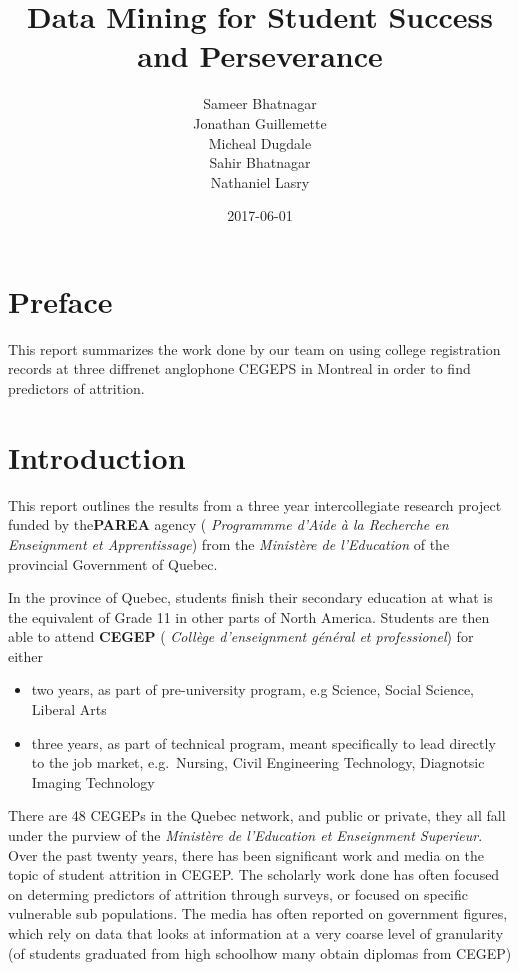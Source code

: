 \documentclass[]{book}
\title{Data Mining for Student Success and Perseverance}
\author{Sameer Bhatnagar \\ Jonathan Guillemette \\ Micheal Dugdale \\ Sahir Bhatnagar \\ Nathaniel Lasry}
\date{2017-06-01}
\providecommand{\tightlist}{%
  \setlength{\itemsep}{0pt}\setlength{\parskip}{0pt}}
\theoremstyle{definition}
\theoremstyle{definition}
\theoremstyle{remark}
\begin{document}
\maketitle

{
\setcounter{tocdepth}{1}
\tableofcontents
}
\chapter{Preface}\label{preface}

This report summarizes the work done by our team on using college
registration records at three diffrenet anglophone CEGEPS in Montreal in
order to find predictors of attrition.

\chapter{Introduction}\label{intro}

This report outlines the results from a three year intercollegiate
research project funded by the\textbf{PAREA} agency ( \emph{Programmme
d'Aide à la Recherche en Enseignment et Apprentissage}) from the
\emph{Ministère de l'Education} of the provincial Government of Quebec.

In the province of Quebec, students finish their secondary education at
what is the equivalent of Grade 11 in other parts of North America.
Students are then able to attend \textbf{CEGEP} ( \emph{Collège
d'enseignment général et professionel}) for either

\begin{itemize}
\tightlist
\item
  two years, as part of pre-university program, e.g Science, Social
  Science, Liberal Arts
\item
  three years, as part of technical program, meant specifically to lead
  directly to the job market, e.g.~Nursing, Civil Engineering
  Technology, Diagnotsic Imaging Technology
\end{itemize}

There are 48 CEGEPs in the Quebec network, and public or private, they
all fall under the purview of the \emph{Ministère de l'Education et
Enseignment Superieur}. Over the past twenty years, there has been
significant
work\citep{jorgensen2003students, jorgensen2005academic, jorgensen2009predicting, riviere1995decrocheurs, shaienks2008statcan}
and media
\citep{breton2016soleil, dion-viens2015lapresse, duchaine2017lapresse}
on the topic of student attrition in CEGEP. The scholarly work done has
often focused on determing predictors of attrition through surveys, or
focused on specific vulnerable sub populations. The media has often
reported on government figures, which rely on data that looks at
information at a very coarse level of granularity (of students graduated
from high schoolhow many obtain diplomas from CEGEP)
\end{document}
